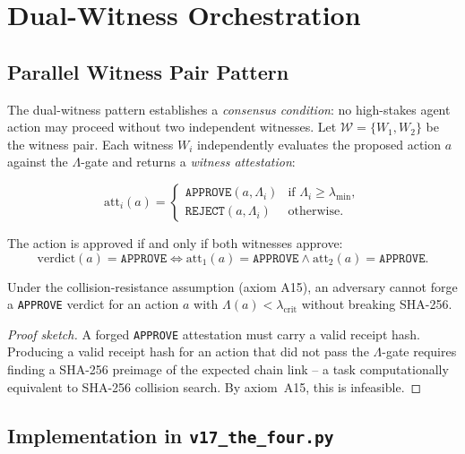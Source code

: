 \section{Dual-Witness Orchestration}
\label{sec:dual-witness-impl}

\subsection{Parallel Witness Pair Pattern}
\label{ssec:witness-pair}

The dual-witness pattern establishes a \emph{consensus condition}: no
high-stakes agent action may proceed without two independent witnesses.
Let \(\mathcal{W} = \{W_1, W_2\}\) be the witness pair.  Each witness
\(W_i\) independently evaluates the proposed action \(a\) against the
\(\Lambda\)-gate and returns a \emph{witness attestation}:

\[
  \mathrm{att}_i(a) = \begin{cases}
    \texttt{APPROVE}(a, \Lambda_i) & \text{if } \Lambda_i \geq \lambda_{\min}, \\
    \texttt{REJECT}(a, \Lambda_i)  & \text{otherwise.}
  \end{cases}
\]

The action is approved if and only if both witnesses approve:
\[
  \mathrm{verdict}(a) = \texttt{APPROVE} \iff
  \mathrm{att}_1(a) = \texttt{APPROVE} \wedge
  \mathrm{att}_2(a) = \texttt{APPROVE}.
\]

\begin{theorem}
  \label{thm:dual-witness-soundness}
  Under the collision-resistance assumption (axiom A15), an adversary cannot
  forge a \texttt{APPROVE} verdict for an action \(a\) with
  \(\Lambda(a) < \lambda_{\mathrm{crit}}\) without breaking SHA-256.
\end{theorem}

\begin{proof}[Proof sketch]
  A forged \texttt{APPROVE} attestation must carry a valid receipt hash.
  Producing a valid receipt hash for an action that did not pass the
  \(\Lambda\)-gate requires finding a SHA-256 preimage of the expected
  chain link -- a task computationally equivalent to SHA-256 collision
  search.  By axiom~A15, this is infeasible.
\end{proof}

\subsection{Implementation in \texttt{v17\_the\_four.py}}
\label{ssec:dual-witness-impl}

